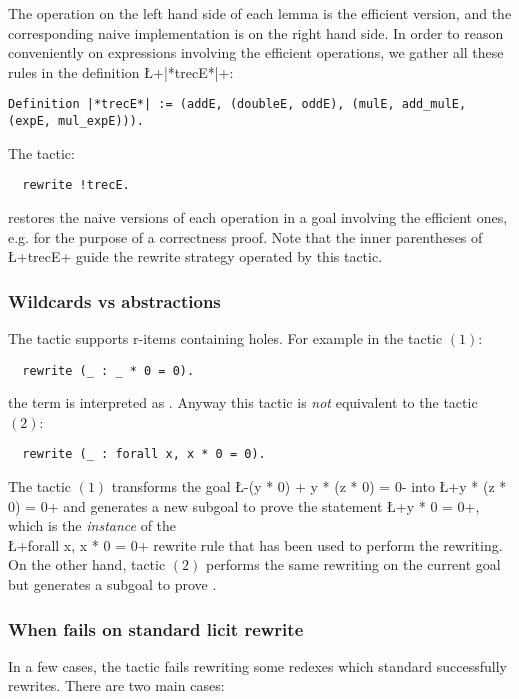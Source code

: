 The operation on the left hand side of each lemma is the efficient
version, and the corresponding naive implementation is on the right
hand side. In order to reason conveniently on expressions involving
the efficient operations, we gather all these rules in the
definition \L+|*trecE*|+:
\begin{lstlisting}
Definition |*trecE*| := (addE, (doubleE, oddE), (mulE, add_mulE, (expE, mul_expE))).
\end{lstlisting}
The tactic:
\begin{lstlisting}
  rewrite !trecE.
\end{lstlisting}
restores the naive versions of each operation in a goal involving the
efficient ones, e.g. for the purpose of a correctness proof. Note that
the inner parentheses of \L+trecE+ guide the rewrite strategy operated
by this tactic.

\subsubsection*{Wildcards vs abstractions}
     The  tactic supports r-items containing holes. For example
      in the tactic $(1)$:
\begin{lstlisting}
  rewrite (_ : _ * 0 = 0).
\end{lstlisting}
      the term  is interpreted as .
      Anyway this tactic is \emph{not} equivalent to the tactic $(2)$:
\begin{lstlisting}
  rewrite (_ : forall x, x * 0 = 0).
\end{lstlisting}
      The tactic $(1)$ transforms the goal
      \L-(y * 0) + y * (z * 0) = 0- into \L+y * (z * 0) = 0+
      and generates a new subgoal to prove the statement \L+y * 0 = 0+,
      which is the \emph{instance} of the\\ \L+forall x, x * 0 = 0+
      rewrite rule that
      has been used to perform the rewriting. On the other hand, tactic
      $(2)$ performs the same rewriting on the current goal but generates a
      subgoal to prove .

\subsubsection*{When \ssr{}  fails on standard \Coq{} licit rewrite}
In a few cases, the \ssr{}  tactic fails
rewriting some redexes which standard \Coq{} successfully rewrites.
There are two main cases:

